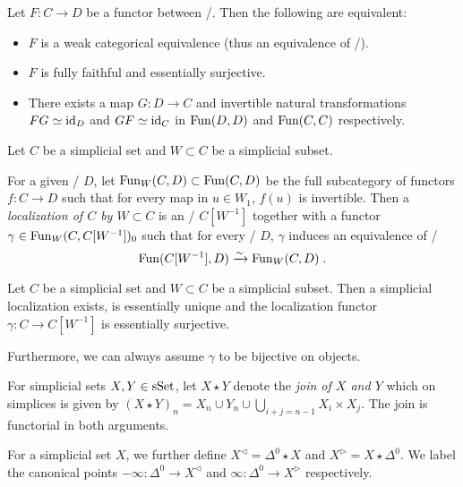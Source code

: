 \begin{thm}\label{thm:eqCharEqOfInftycats}
    Let $F\colon C\to D$ be a functor between \inftycats/.
    Then the following are equivalent:
    \begin{itemize}
        \item $F$ is a weak categorical equivalence (thus an equivalence of \inftycats/).
        \item $F$ is fully faithful and essentially surjective.
        \item There exists a map $G\colon D\to C$ and invertible natural transformations $FG\simeq \text{id}_D$ and $GF\simeq \text{id}_C$ in $\operatorname{Fun}(D,D)$ and $\operatorname{Fun}(C,C)$ respectively.
    \end{itemize}
    \begin{reference}
        \cite[Corollary 3.6.6 and Theorem 3.9.7]{cisinski_2019}
    \end{reference}
\end{thm}
\begin{definition}
    Let $C$ be a simplicial set and $W\subset C$ be a simplicial subset.

    For a given \inftycat/ $D$, let $\operatorname{Fun}_W(C,D)\subset\operatorname{Fun}(C,D)$ be the full subcategory of functors $f\colon C\to D$ such that for every map in $u\in W_1$, $f(u)$ is invertible.
    Then a \emph{localization of $C$ by $W\subset C$} is an \inftycat/ $C[W^{-1}]$ together with a functor $\gamma\in\operatorname{Fun}_W(C, C[W^{-1}])_0$ such that for every \inftycat/ $D$, $\gamma$ induces an equivalence of \inftycats/
    \begin{equation*}
        \operatorname{Fun}(C[W^{-1}],D)\xrightarrow{\sim}\operatorname{Fun}_W(C,D)\;.
    \end{equation*}
\end{definition}
\begin{lemma}\label{prop:simpLocEssSurj}
    Let $C$ be a simplicial set and $W\subset C$ be a simplicial subset.
    Then a simplicial localization exists, is essentially unique and the localization functor $\gamma\colon C\to C[W^{-1}]$ is essentially surjective.

    Furthermore, we can always assume $\gamma$ to be bijective on objects.
    \begin{reference}
        \cite[Proposition 7.1.3 and Remark 7.1.4]{cisinski_2019}
    \end{reference}
\end{lemma}
\begin{definition}[Join]
    For simplicial sets $X,Y\in\operatorname{sSet}$, let $X\star Y$ denote the \emph{join of $X$ and $Y$} which on simplices is given by $(X\star Y)_n=X_n\cup Y_n\cup\bigcup\limits_{i+j=n-1}X_i\times X_j$.
    The join is functorial in both arguments.
    
    For a simplicial set $X$, we further define $X^{\lhd}=\Delta^0\star X$ and $X^{\rhd}=X\star\Delta^0$.
    We label the canonical points $-\infty\colon\Delta^0\to X^{\lhd}$ and $\infty\colon\Delta^0\to X^{\rhd}$ respectively.
\end{definition}
